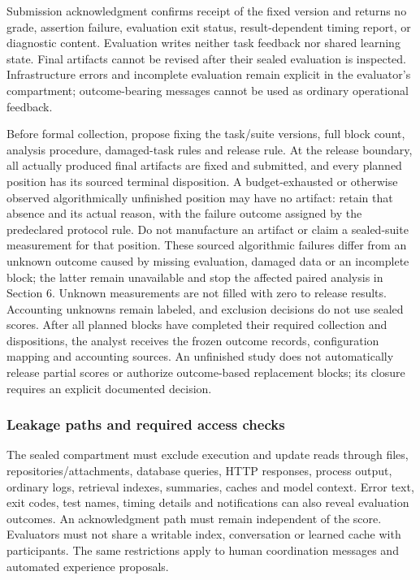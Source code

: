 \documentclass[
  english,
  11pt,
]{article}
\begin{document}
Submission acknowledgment confirms receipt of the fixed version and
returns no grade, assertion failure, evaluation exit status,
result-dependent timing report, or diagnostic content. Evaluation writes
neither task feedback nor shared learning state. Final artifacts cannot
be revised after their sealed evaluation is inspected. Infrastructure
errors and incomplete evaluation remain explicit in the evaluator's
compartment; outcome-bearing messages cannot be used as ordinary
operational feedback.

Before formal collection, propose fixing the task/suite versions, full
block count, analysis procedure, damaged-task rules and release rule. At
the release boundary, all actually produced final artifacts are fixed
and submitted, and every planned position has its sourced terminal
disposition. A budget-exhausted or otherwise observed algorithmically
unfinished position may have no artifact: retain that absence and its
actual reason, with the failure outcome assigned by the predeclared
protocol rule. Do not manufacture an artifact or claim a sealed-suite
measurement for that position. These sourced algorithmic failures differ
from an unknown outcome caused by missing evaluation, damaged data or an
incomplete block; the latter remain unavailable and stop the affected
paired analysis in Section 6. Unknown measurements are not filled with
zero to release results. Accounting unknowns remain labeled, and
exclusion decisions do not use sealed scores. After all planned blocks
have completed their required collection and dispositions, the analyst
receives the frozen outcome records, configuration mapping and
accounting sources. An unfinished study does not automatically release
partial scores or authorize outcome-based replacement blocks; its
closure requires an explicit documented decision.

\subsubsection{Leakage paths and required access
checks}\label{leakage-paths-and-required-access-checks}

The sealed compartment must exclude execution and update reads through
files, repositories/attachments, database queries, HTTP responses,
process output, ordinary logs, retrieval indexes, summaries, caches and
model context. Error text, exit codes, test names, timing details and
notifications can also reveal evaluation outcomes. An acknowledgment
path must remain independent of the score. Evaluators must not share a
writable index, conversation or learned cache with participants. The
same restrictions apply to human coordination messages and automated
experience proposals.
\end{document}
